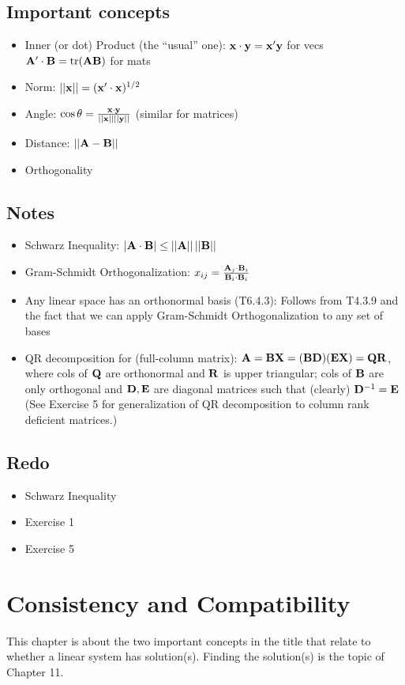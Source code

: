 \documentclass[a4paper, oneside]{book}
\begin{document}
\section*{Important concepts}
\begin{itemize}
\item Inner (or dot) Product (the ``usual'' one): $\mathbf{x}\cdot\mathbf{y} = \mathbf{x'y}$ for vecs $\mathbf{A'\cdot B} = \text{tr}(\mathbf{AB})$ for mats
\item Norm: $||\mathbf x|| = (\mathbf{x'\cdot x})^{1/2}$
\item Angle: $\cos \theta = \frac{\mathbf{x \cdot y}}{||\mathbf{x}|| ||\mathbf{y}||}$ (similar for matrices)
\item Distance: $||\mathbf{A-B}||$
\item Orthogonality
\end{itemize}

\section*{Notes}
\begin{itemize}
\item Schwarz Inequality: $|\mathbf{A\cdot B}|\leq ||\mathbf{A}||\,||\mathbf{B}||$
\item Gram-Schmidt Orthogonalization: $x_{ij}=\frac{\mathbf{A}_j\cdot \mathbf{B}_i}{\mathbf{B}_i \cdot \mathbf{B}_i}$
\item Any linear space has an orthonormal basis (T6.4.3): Follows from T4.3.9 and the fact that we can apply Gram-Schmidt Orthogonalization to any set of bases 
\item QR decomposition for (full-column matrix): $\mathbf{A=BX=(BD)(EX)=QR}$, where cols of $\mathbf Q$ are orthonormal and $\mathbf{R}$ is upper triangular; cols of $\mathbf B$ are only orthogonal and $\mathbf{D,E}$ are diagonal matrices such that (clearly) $\mathbf D^{-1} = \mathbf E$ (See Exercise 5 for generalization of QR decomposition to column rank deficient matrices.)
\end{itemize}

\section*{Redo}
\begin{itemize}
\item Schwarz Inequality
\item Exercise 1
\item Exercise 5
\end{itemize}

\chapter{Consistency and Compatibility}
This chapter is about the two important concepts in the title that relate to whether a linear system has solution(s). Finding the solution(s) is the topic of Chapter 11.
\end{document}
